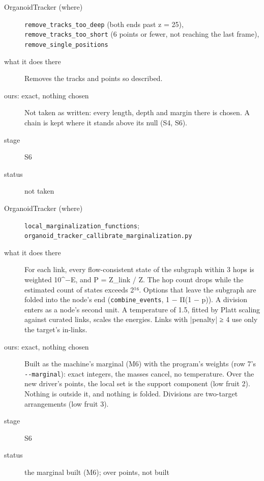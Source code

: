 \begin{description}
\item[{OrganoidTracker (where)}] \texttt{remove\_\allowbreak{}tracks\_\allowbreak{}too\_\allowbreak{}deep} (both ends past z = 25), \texttt{remove\_\allowbreak{}tracks\_\allowbreak{}too\_\allowbreak{}short} (6 points or fewer, not reaching the last frame), \texttt{remove\_\allowbreak{}single\_\allowbreak{}positions}
\item[{what it does there}] Removes the tracks and points so described.
\item[{ours: exact, nothing chosen}] Not taken as written: every length, depth and margin there is chosen. A chain is kept where it stands above its null (S4, S6).
\item[{stage}] S6
\item[{status}] not taken
\end{description}

\begin{description}
\item[{OrganoidTracker (where)}] \texttt{local\_\allowbreak{}marginalization\_\allowbreak{}functions}; \texttt{organoid\_\allowbreak{}tracker\_\allowbreak{}callibrate\_\allowbreak{}marginalization.\allowbreak{}py}
\item[{what it does there}] For each link, every flow-consistent state of the subgraph within 3 hops is weighted 10\textasciicircum{}−E, and P = Z\_\allowbreak{}link / Z. The hop count drops while the estimated count of states exceeds 2¹⁶. Options that leave the subgraph are folded into the node's end (\texttt{combine\_\allowbreak{}events}, 1 − Π(1 − p)). A division enters as a node's second unit. A temperature of 1.5, fitted by Platt scaling against curated links, scales the energies. Links with |penalty| ≥ 4 use only the target's in-links.
\item[{ours: exact, nothing chosen}] Built as the machine's marginal (M6) with the program's weights (row 7's \texttt{-\allowbreak{}-\allowbreak{}marginal}): exact integers, the masses cancel, no temperature. Over the new driver's points, the local set is the support component (low fruit 2). Nothing is outside it, and nothing is folded. Divisions are two-target arrangements (low fruit 3).
\item[{stage}] S6
\item[{status}] the marginal built (M6); over points, not built
\end{description}

